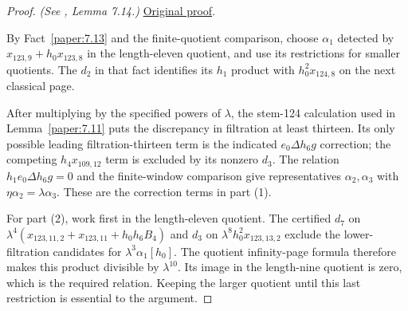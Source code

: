 \begin{proof}
\textit{(See \cite{LWX126}, Lemma 7.14.)} \href{paper/main.tex.html#L2405}{Original proof}.

By Fact~\ref{paper:7.13} and the finite-quotient comparison, choose $\alpha_1$ detected by $x_{123,9}+h_0x_{123,8}$ in the length-eleven quotient, and use its restrictions for smaller quotients. The $d_2$ in that fact identifies its $h_1$ product with $h_0^2x_{124,8}$ on the next classical page.

After multiplying by the specified powers of $\lambda$, the stem-124 calculation used in Lemma~\ref{paper:7.11} puts the discrepancy in filtration at least thirteen. Its only possible leading filtration-thirteen term is the indicated $e_0\Delta h_6g$ correction; the competing $h_4x_{109,12}$ term is excluded by its nonzero $d_3$. The relation $h_1e_0\Delta h_6g=0$ and the finite-window comparison give representatives $\alpha_2,\alpha_3$ with $\eta\alpha_2=\lambda\alpha_3$. These are the correction terms in part (1).

For part (2), work first in the length-eleven quotient. The certified $d_7$ on $\lambda^4(x_{123,11,2}+x_{123,11}+h_0h_6B_4)$ and $d_3$ on $\lambda^8h_0^2x_{123,13,2}$ exclude the lower-filtration candidates for $\lambda^3\alpha_1[h_0]$. The quotient infinity-page formula therefore makes this product divisible by $\lambda^{10}$. Its image in the length-nine quotient is zero, which is the required relation. Keeping the larger quotient until this last restriction is essential to the argument.
\end{proof}

